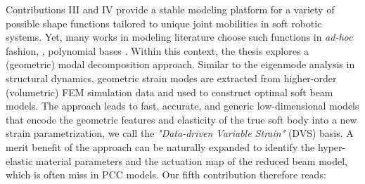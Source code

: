 Contributions III and IV provide a stable modeling platform for a variety of possible shape functions tailored to unique joint mobilities in soft robotic systems. Yet, many works in modeling literature choose such functions in \textit{ad-hoc} fashion, \eg, polynomial bases \cite{DellaSantina2020,Boyer2021,Chirikjian1991}. Within this context, the thesis explores a (geometric) modal decomposition approach. Similar to the eigenmode analysis in structural dynamics, geometric strain modes are extracted from higher-order (volumetric) FEM simulation data and used to construct optimal soft beam models. The approach leads to fast, accurate, and generic low-dimensional models that encode the geometric features and elasticity of the true soft body into a new strain parametrization, we call the \textit{"Data-driven Variable Strain"} (DVS) basis. A merit benefit of the approach can be naturally expanded to identify the hyper-elastic material parameters and the actuation map of the reduced beam model, which is often miss in PCC models. Our fifth contribution therefore reads: %
 

